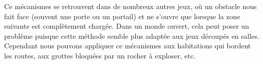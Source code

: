 \documentclass[a4paper, 11pt]{article} %
\begin{document}
Ce mécanismes se retrouvent dans de nombreux autres jeux, où un obstacle nous fait face (souvent une porte ou un portail) et ne s'ouvre que lorsque la zone suivante est complètement chargée.
Dans un monde ouvert, cela peut poser un problème puisque cette méthode semble plus adaptée aux jeux découpés en salles. Cependant nous pouvons appliquer ce mécanismes aux habitations qui bordent les routes, aux grottes bloquées par un rocher à exploser, etc.



\newpage



\end{document}
